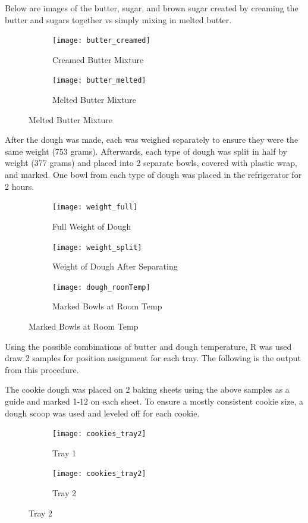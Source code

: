 \documentclass[paper=a4, fontsize=11pt]{scrartcl} %
\numberwithin{equation}{section} %
\numberwithin{figure}{section} %
\numberwithin{table}{section} %
\begin{document}
Below are images of the butter, sugar, and brown sugar created by creaming the butter and sugars together vs simply mixing in melted butter.

\begin{figure}[H]
	\begin{subfigure}{.5\textwidth}
		\centering
		\texttt{[image: butter\_creamed]}
		\caption*{Creamed Butter Mixture}
	\end{subfigure}%
	\begin{subfigure}{.5\textwidth}
		\centering
		\texttt{[image: butter\_melted]}
		\caption*{Melted Butter Mixture}
	\end{subfigure}
\end{figure}

After the dough was made, each was weighed separately to ensure they were the same weight (753 grams). Afterwards, each type of dough was split in half by weight (377 grams) and placed into 2 separate bowls, covered with plastic wrap, and marked. One bowl from each type of dough was placed in the refrigerator for 2 hours.

\begin{figure}[H]
	\begin{subfigure}{.33\textwidth}
		\centering
		\texttt{[image: weight\_full]}
		\caption*{Full Weight of Dough}
	\end{subfigure}%
	\begin{subfigure}{.33\textwidth}
		\centering
		\texttt{[image: weight\_split]}
		\caption*{Weight of Dough After Separating}
	\end{subfigure}
	\begin{subfigure}{.33\textwidth}
		\centering
		\texttt{[image: dough\_roomTemp]}
		\caption*{Marked Bowls at Room Temp}
	\end{subfigure}
\end{figure}



Using the possible combinations of butter and dough temperature, R was used draw 2 samples for position assignment for each tray. The following is the output from this procedure.

\newpage


The cookie dough was placed on 2 baking sheets using the above samples as a guide and marked 1-12 on each sheet. To ensure a mostly consistent cookie size, a dough scoop was used and leveled off for each cookie.

\begin{figure}[H]
	\begin{subfigure}{.5\textwidth}
		\centering
		\texttt{[image: cookies\_tray2]}
		\caption*{Tray 1}
	\end{subfigure}%
	\begin{subfigure}{.5\textwidth}
		\centering
		\texttt{[image: cookies\_tray2]}
		\caption*{Tray 2}
	\end{subfigure}
\end{figure}
\end{document}
